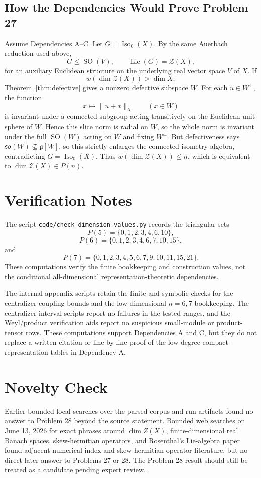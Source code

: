 \documentclass[11pt]{article}
\theoremstyle{remark}
\newcommand{\fg}{\mathfrak g}
\newcommand{\so}{\mathfrak{so}}
\DeclareMathOperator{\SO}{SO}
\DeclareMathOperator{\Iso}{Iso}
\DeclareMathOperator{\Lie}{Lie}
\begin{document}
\subsection*{How the Dependencies Would Prove Problem 27}

Assume Dependencies A--C.  Let \(G=\Iso_0(X)\).  By the same Auerbach
reduction used above,
\[
G\leq\SO(V),\qquad \Lie(G)=\mathcal Z(X),
\]
for an auxiliary Euclidean structure on the underlying real vector space
\(V\) of \(X\).  If
\[
w(\dim\mathcal Z(X))>\dim X,
\]
Theorem~\ref{thm:defective} gives a nonzero defective subspace \(W\).  For
each \(u\in W^\perp\), the function
\[
x\mapsto \|u+x\|_X\qquad(x\in W)
\]
is invariant under a connected subgroup acting transitively on the Euclidean
unit sphere of \(W\).  Hence this slice norm is radial on \(W\), so the whole
norm is invariant under the full \(\SO(W)\) acting on \(W\) and fixing
\(W^\perp\).  But defectiveness says \(\so(W)\not\subseteq\fg[W]\), so this
strictly enlarges the connected isometry algebra, contradicting
\(G=\Iso_0(X)\).  Thus \(w(\dim\mathcal Z(X))\leq n\), which is equivalent
to \(\dim\mathcal Z(X)\in P(n)\).

\section*{Verification Notes}

The script \texttt{code/check\_dimension\_values.py} records the triangular
sets
\[
P(5)=\{0,1,2,3,4,6,10\},
\]
\[
P(6)=\{0,1,2,3,4,6,7,10,15\},
\]
and
\[
P(7)=\{0,1,2,3,4,5,6,7,9,10,11,15,21\}.
\]
These computations verify the finite bookkeeping and construction values,
not the conditional all-dimensional representation-theoretic dependencies.

The internal appendix scripts retain the finite and symbolic checks for the
centralizer-coupling bounds and the low-dimensional \(n=6,7\) bookkeeping.
The centralizer interval scripts report no failures in the tested ranges, and
the Weyl/product verification aids report no suspicious small-module or
product-tensor rows.  These computations support Dependencies A and C, but
they do not replace a written citation or line-by-line proof of the
low-degree compact-representation tables in Dependency A.

\section*{Novelty Check}

Earlier bounded local searches over the parsed corpus and run artifacts found
no answer to Problem 28 beyond the source statement.  Bounded web searches on
June 13, 2026 for exact phrases around \(\dim Z(X)\), finite-dimensional real
Banach spaces, skew-hermitian operators, and Rosenthal's Lie-algebra paper
found adjacent numerical-index and skew-hermitian-operator literature, but no
direct later answer to Problems 27 or 28.  The Problem 28 result should still
be treated as a candidate pending expert review.
\end{document}
